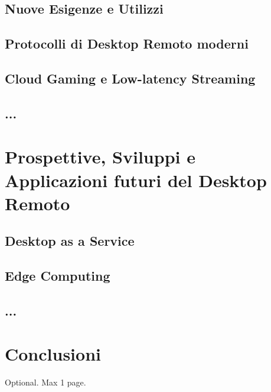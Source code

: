\documentclass[12pt,a4paper,openright,twoside]{book}
\begin{document}
\section{Nuove Esigenze e Utilizzi}

\section{Protocolli di Desktop Remoto moderni}

\section{Cloud Gaming e Low-latency Streaming}

\section{...}

\chapter{Prospettive, Sviluppi e Applicazioni futuri del Desktop Remoto}

\section{Desktop as a Service}

\section{Edge Computing}

\section{...}

\chapter{Conclusioni}
\label{chap:conclusions}


\backmatter

\nocite{*} %


    

\begin{acknowledgements} %
Optional. Max 1 page.
\end{acknowledgements}
\end{document}
